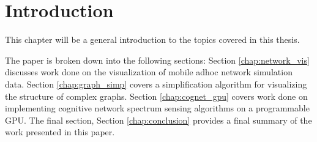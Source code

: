 \chapter{Introduction}
This chapter will be a general introduction to the topics covered in this thesis.

The paper is broken down into the following sections:  Section \ref{chap:network_vis} discusses work done on the visualization of mobile adhoc network simulation data.  Section \ref{chap:graph_simp} covers a simplification algorithm for visualizing the structure of complex graphs.  Section \ref{chap:cognet_gpu} covers work done on implementing cognitive network spectrum sensing algorithms on a programmable GPU.  The final section, Section \ref{chap:conclusion} provides a final summary of the work presented in this paper.
